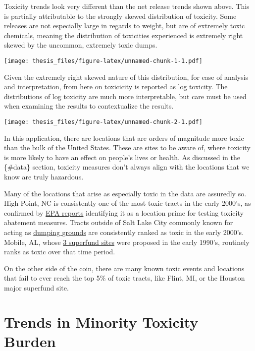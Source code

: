 \documentclass[12pt,twoside]{dukestatscithesis}
\theoremstyle{definition}
\theoremstyle{definition}
\theoremstyle{definition}
\theoremstyle{remark}
\begin{document}
Toxicity trends look very different than the net release trends shown
above. This is partially attributable to the strongly skewed
distribution of toxicity. Some releases are not especially large in
regards to weight, but are of extremely toxic chemicals, meaning the
distribution of toxicities experienced is extremely right skewed by the
uncommon, extremely toxic dumps.

\texttt{[image: thesis\_files/figure-latex/unnamed-chunk-1-1.pdf]}

Given the extremely right skewed nature of this distribution, for ease
of analysis and interpretation, from here on toxicicity is reported as
log toxicity. The distributions of log toxicity are much more
interpretable, but care must be used when examining the results to
contextualize the results.

\texttt{[image: thesis\_files/figure-latex/unnamed-chunk-2-1.pdf]}

In this application, there are locations that are orders of magnitude
more toxic than the bulk of the United States. These are sites to be
aware of, where toxicity is more likely to have an effect on people's
lives or health. As discussed in the \{\#data\} section, toxicity
measures don't always align with the locations that we know are truly
hazardous.

Many of the locations that arise as especially toxic in the data are
assuredly so. High Point, NC is consistently one of the most toxic
tracts in the early 2000's, as confirmed by
\href{https://cfpub.epa.gov/si/si_public_record_Report.cfm?dirEntryID=45198}{EPA
reports} identifying it as a location prime for testing toxicity
abatement measures. Tracts outside of Salt Lake City commonly known for
acting as
\href{http://www.nytimes.com/2002/10/20/us/utah-county-s-toxic-tradition-is-under-threat.html}{dumping
grounds} are consistently ranked as toxic in the early 2000's. Mobile,
AL, whose
\href{https://19january2017snapshot.epa.gov/enforcement/case-summary-epa-funded-sites-and-communities-chemtura-bankruptcy-settlements_.html\#stauffer}{3
superfund sites} were proposed in the early 1990's, routinely ranks as
toxic over that time period.

On the other side of the coin, there are many known toxic events and
locations that fail to ever reach the top 5\% of toxic tracts, like
Flint, MI, or the Houston major superfund site.

\section{Trends in Minority Toxicity
Burden}\label{trends-in-minority-toxicity-burden}
\end{document}
